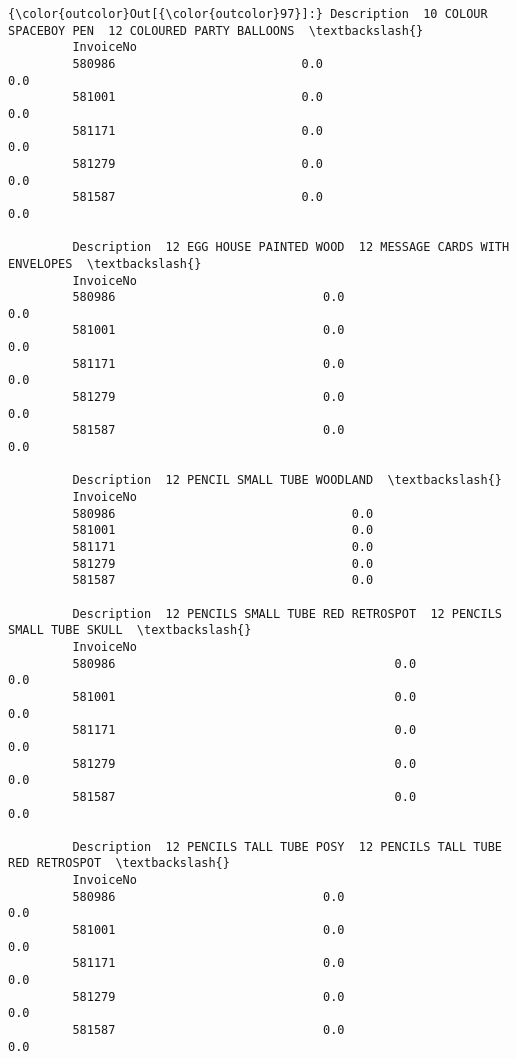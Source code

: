 \documentclass[11pt]{article}
\begin{document}
\begin{Verbatim}[commandchars=\\\{\}]
{\color{outcolor}Out[{\color{outcolor}97}]:} Description  10 COLOUR SPACEBOY PEN  12 COLOURED PARTY BALLOONS  \textbackslash{}
         InvoiceNo                                                         
         580986                          0.0                         0.0   
         581001                          0.0                         0.0   
         581171                          0.0                         0.0   
         581279                          0.0                         0.0   
         581587                          0.0                         0.0   
         
         Description  12 EGG HOUSE PAINTED WOOD  12 MESSAGE CARDS WITH ENVELOPES  \textbackslash{}
         InvoiceNo                                                                 
         580986                             0.0                              0.0   
         581001                             0.0                              0.0   
         581171                             0.0                              0.0   
         581279                             0.0                              0.0   
         581587                             0.0                              0.0   
         
         Description  12 PENCIL SMALL TUBE WOODLAND  \textbackslash{}
         InvoiceNo                                    
         580986                                 0.0   
         581001                                 0.0   
         581171                                 0.0   
         581279                                 0.0   
         581587                                 0.0   
         
         Description  12 PENCILS SMALL TUBE RED RETROSPOT  12 PENCILS SMALL TUBE SKULL  \textbackslash{}
         InvoiceNo                                                                       
         580986                                       0.0                          0.0   
         581001                                       0.0                          0.0   
         581171                                       0.0                          0.0   
         581279                                       0.0                          0.0   
         581587                                       0.0                          0.0   
         
         Description  12 PENCILS TALL TUBE POSY  12 PENCILS TALL TUBE RED RETROSPOT  \textbackslash{}
         InvoiceNo                                                                    
         580986                             0.0                                 0.0   
         581001                             0.0                                 0.0   
         581171                             0.0                                 0.0   
         581279                             0.0                                 0.0   
         581587                             0.0                                 0.0   
         

\end{Verbatim}
\end{document}
